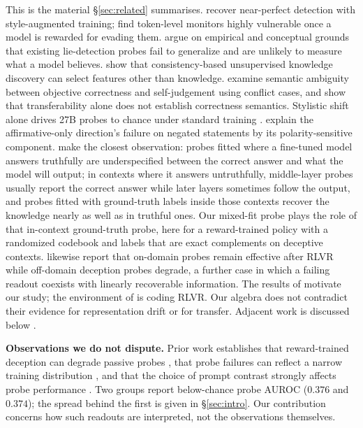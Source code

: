 \documentclass{article}
\begin{document}
This is the material \S\ref{sec:related} summarises. \citet{pressuretesting2026} recover near-perfect detection with style-augmented training; \citet{rlobfuscation2025} find token-level monitors highly vulnerable once a model is rewarded for evading them. \citet{levinstein2023} argue on empirical and conceptual grounds that existing lie-detection probes fail to generalize and are unlikely to measure what a model believes. \citet{farquhar2023} show that consistency-based unsupervised knowledge discovery can select features other than knowledge. \citet{lu2026} examine semantic ambiguity between objective correctness and self-judgement using conflict cases, and show that transferability alone does not establish correctness semantics. Stylistic shift alone drives 27B probes to chance under standard training \citep{pressuretesting2026}. \citet{burger2024} explain the affirmative-only direction's failure on negated statements by its polarity-sensitive component. \citet{mallen2024} make the closest observation: probes fitted where a fine-tuned model answers truthfully are underspecified between the correct answer and what the model will output; in contexts where it answers untruthfully, middle-layer probes usually report the correct answer while later layers sometimes follow the output, and probes fitted with ground-truth labels inside those contexts recover the knowledge nearly as well as in truthful ones. Our mixed-fit probe plays the role of that in-context ground-truth probe, here for a reward-trained policy with a randomized codebook and labels that are exact complements on deceptive contexts. \citet{obfuscationatlas2026} likewise report that on-domain probes remain effective after RLVR while off-domain deception probes degrade, a further case in which a failing readout coexists with linearly recoverable information. The results of \citet{goldowskydill2025,obfuscationatlas2026,oneprobe2026} motivate our study; the environment of \citet{obfuscationatlas2026} is coding RLVR. Our algebra does not contradict their evidence for representation drift or for transfer. Adjacent work is discussed below \citep{offpolicyprobes2026,contextshapestruth2026,strategicdishonesty2025,rift2026,liedetectorlimits2026,geometryoftruth2024}.

\textbf{Observations we do not dispute.} Prior work establishes that reward-trained deception can degrade passive probes \citep{obfuscationatlas2026,rlobfuscation2025}, that probe failures can reflect a narrow training distribution \citep{pressuretesting2026}, and that the choice of prompt contrast strongly affects probe performance \citep{oneprobe2026}. Two groups report below-chance probe AUROC ($0.376$ and $0.374$); the spread behind the first is given in \S\ref{sec:intro}. Our contribution concerns how such readouts are interpreted, not the observations themselves.
\end{document}
